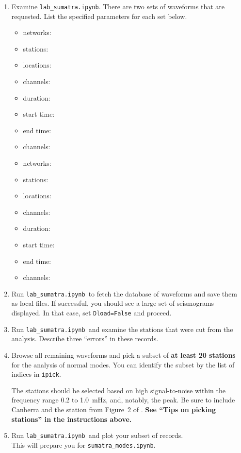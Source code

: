 \documentclass[11pt,titlepage,fleqn]{article}
\newcommand{\tfile}{{\tt lab\_sumatra.ipynb}}
\begin{document}
\begin{enumerate}
\item Examine \tfile. There are two sets of waveforms that are requested. List the specified parameters for each set below.

\begin{itemize}
\item networks:
\item stations: 
\item locations: 
\item channels: 
\item duration: 
\item start time: 
\item end time: 
\item channels:
\end{itemize}

\begin{itemize}
\item networks:
\item stations: 
\item locations: 
\item channels: 
\item duration: 
\item start time: 
\item end time: 
\item channels:
\end{itemize}

\item Run \tfile\ to fetch the database of waveforms and save them as local files. If successful, you should see a large set of seismograms displayed. In that case, set \verb+Dload=False+ and proceed.

\item  Run \tfile\ and examine the stations that were cut from the analysis. Describe three ``errors'' in these records.

\item Browse all remaining waveforms and pick a subset of {\bf at least 20 stations} for the analysis of normal modes. You can identify the subset by the list of indices in \verb+ipick+.

%
%
The stations should be selected based on high signal-to-noise within the frequency range 0.2 to 1.0~mHz, and, notably, the  peak. Be sure to include Canberra and the station from Figure~2 of \citet{Park2005}.
{\bf See ``Tips on picking stations'' in the instructions above.}

\item Run \tfile\ and plot your subset of records. \\
This will prepare you for \verb+sumatra_modes.ipynb+.

\end{enumerate}
\end{document}

